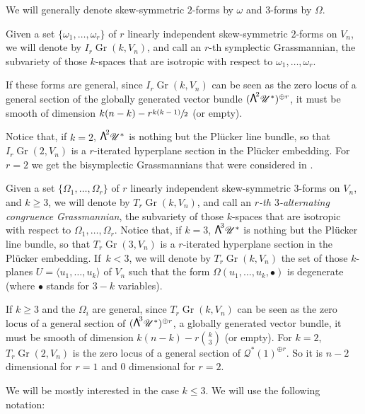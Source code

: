 \documentclass[JEP,XML,SOM,Unicode,NoEqCountersInSection]{cedram}
\newcommand{\sbullet}{{\scriptstyle\bullet}}
\newcommand\bw[1]{{\hbox{\large$\mathsf{\Lambda}$}^{\!#1}}}
\let\mathcal\mathscr
\theoremstyle{plain}
\theoremstyle{definition}
\newcommand{\linedef}[1]{\emph{#1}}
\DeclareMathOperator{\Gr}{Gr}
\newcommand{\sheaf}[1]{\mathcal{#1}}
\newcommand{\kq}{\sheaf{Q}}
\newcommand{\ku}{\sheaf{U}}
\begin{document}
We will generally denote skew-symmetric $2$-forms by $\omega$ and $3$-forms by
$\Omega$.

Given a set $\{\omega_1,\ldots,\omega_r\}$ of
$r$ linearly independent skew-symmetric $2$-forms on $V_n$, we will denote by $I_r\Gr(k,V_n)$,
and call an $r$-th symplectic Grassmannian,
the subvariety of those $k$-spaces that are isotropic with respect to $\omega_1,\ldots,\omega_r$.

If these forms are general, since $I_r\Gr(k,V_n)$ can be seen as the zero locus of a general section of the globally generated vector bundle $(\bw2 \ku^*)^{\oplus r}$,
it must be smooth of dimension $k(n-k) - r \sfrac{k(k-1)}{2}$ (or empty).

Notice that, if $k=2$, $\bw2 \ku^*$ is nothing but the Plücker line bundle, so that
$I_r \Gr(2,V_n)$ is a $r$-iterated hyperplane section in the Plücker embedding.
For $r=2$ we get the bisymplectic Grassmannians that
were considered in \cite{vlad-bi}.

Given a set $\{\Omega_1,\ldots,\Omega_r\}$ of
$r$ linearly independent skew-symmetric $3$-forms on $V_n$, and $k \geq 3$, we will denote by $T_r\Gr(k,V_n)$, and call an \linedef{$r$-th $3$-alternating congruence Grassmannian}, the subvariety of those $k$-spaces that are isotropic with respect to $\Omega_1,\ldots,\Omega_r$. Notice that, if $k=3$,
$\bw3 \ku^*$ is nothing but the Plücker line bundle, so that
$T_r \Gr(3,V_n)$ is a $r$-iterated hyperplane section in the Plücker embedding.
If~$k < 3$, we will denote by $T_r \Gr(k,V_n)$ the set of those $k$-planes $U=\langle u_1,\ldots , u_k\rangle $ of $V_n$ such that the form $\Omega(u_1,\ldots , u_k,\sbullet)$ is degenerate (where $\sbullet$ stands for $3-k$ variables).

If $k\ge 3$ and the $\Omega_i$ are general, since $T_r\Gr(k,V_n)$ can be seen as the zero locus of a general section of $(\bw3 \ku^*)^{\oplus r}$, a globally generated vector bundle, it must be smooth of dimension $k(n-k) - r \binom k3$ (or empty). For $k=2$, $T_r\Gr(2,V_n)$ is the zero locus of a general section of $\kq^*(1)^{\oplus r}$. So it is $n-2$ dimensional for $r=1$ and $0$ dimensional for $r=2$.

We will be mostly interested in the case $k \leq 3$. We will use the following notation:
\end{document}
